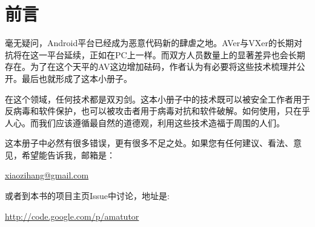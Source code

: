 \chapter{前言}
毫无疑问，Android平台已经成为恶意代码新的肆虐之地。AVer与VXer的长期对抗将在这一平台延续，正如在PC上一样。而双方人员数量上的显著差异也会长期存在。为了在这个天平的AV这边增加砝码，作者认为有必要将这些技术梳理并公开。最后也就形成了这本小册子。

在这个领域，任何技术都是双刃剑。这本小册子中的技术既可以被安全工作者用于反病毒和软件保护，也可以被攻击者用于病毒对抗和软件破解。如何使用，只在乎人心。而我们应该遵循最自然的道德观，利用这些技术造福于周围的人们。

这本册子中必然有很多错误，更有很多不足之处。如果您有任何建议、看法、意见，希望能告诉我，邮箱是：

\begin{center}
\href{mailto:xiaozihang@gmail.com}{xiaozihang@gmail.com}
\end{center}

或者到本书的项目主页Issue中讨论，地址是:

\begin{center}\href{http://code.google.com/p/amatutor}{http://code.google.com/p/amatutor}
\end{center}